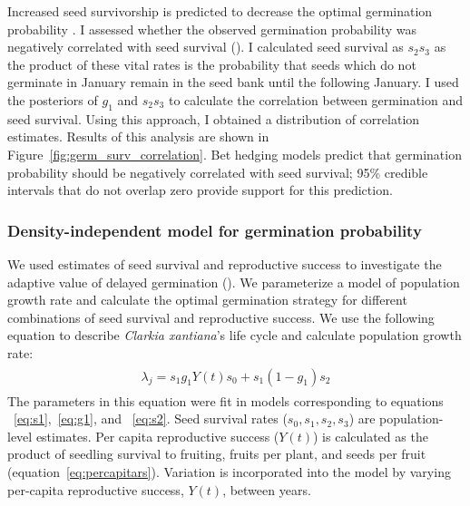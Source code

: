 \documentclass[12pt, oneside, titlepage]{article}   	%
\begin{document}
Increased seed survivorship is predicted to decrease the optimal germination probability \cite{cohen1966,ellner1985a}. I assessed whether the observed germination probability was negatively correlated with seed survival (\cite{gremer2014}). I calculated seed survival as $s_2 s_3$ as the product of these vital rates is the probability that seeds which do not germinate in January remain in the seed bank until the following January. I used the posteriors of $g_1$ and $s_2 s_3$ to calculate the correlation between germination and seed survival. Using this approach, I obtained a distribution of correlation estimates. Results of this analysis are shown in Figure~\ref{fig:germ_surv_correlation}. Bet hedging models predict that germination probability should be negatively correlated with seed survival; 95\% credible intervals that do not overlap zero provide support for this prediction.

\subsubsection*{Density-independent model for germination probability}

We used estimates of seed survival and reproductive success to investigate the adaptive value of delayed germination (\cite{gremer2014}). We parameterize a model of population growth rate and calculate the optimal germination strategy for different combinations of seed survival and reproductive success. We use the following equation to describe \textit{Clarkia xantiana}'s life cycle and calculate population growth rate:
%
\begin{align}
  \begin{split}
\lambda_{j} = s_1 g_1 Y(t) s_0 + s_1 (1-g_1) s_2
  \end{split}
\end{align}
%
The parameters in this equation were fit in models corresponding to equations ~\eqref{eq:s1},~\eqref{eq:g1}, and ~\eqref{eq:s2}. Seed survival rates ($s_0, s_1, s_2, s_3$) are population-level estimates. Per capita reproductive success ($Y(t)$) is calculated as the product of seedling survival to fruiting, fruits per plant, and seeds per fruit (equation~\eqref{eq:percapitars}). Variation is incorporated into the model by varying per-capita reproductive success, $Y(t)$, between years.
\end{document}
